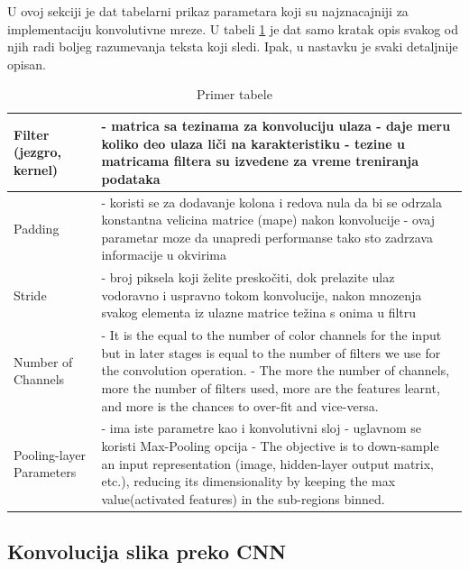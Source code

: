 \documentclass[a4paper]{article}
\begin{document}
U ovoj sekciji je dat tabelarni prikaz parametara koji su najznacajniji za implementaciju konvolutivne mreze. U tabeli \ref{tabela_parametri} je dat samo kratak opis svakog od njih radi boljeg razumevanja teksta koji sledi. Ipak, u nastavku je svaki detaljnije opisan.

\begin{table}[h!]
\begin{center}
\caption{Primer tabele}
\begin{tabular}{|l|p{60mm}|}
\hline
Filter (jezgro, kernel) &
- matrica sa tezinama za konvoluciju ulaza \newline
- daje meru koliko deo ulaza liči na karakteristiku \newline
- tezine u matricama filtera su izvedene za vreme treniranja podataka
\\
\hline
Padding &
- koristi se za dodavanje kolona i redova nula da bi se odrzala konstantna velicina matrice (mape) nakon konvolucije \newline
- ovaj parametar moze da unapredi performanse tako sto zadrzava informacije u okvirima
\\
\hline 
Stride &
- broj piksela koji želite preskočiti, dok prelazite ulaz vodoravno i uspravno tokom konvolucije, nakon mnozenja svakog elementa iz ulazne matrice težina s onima u filtru
\\
\hline 
Number of Channels &
- It is the equal to the number of color channels for the input but in later stages is equal to the number of filters we use for the convolution operation. \newline
- The more the number of channels, more the number of filters used, more are the features learnt, and more is the chances to over-fit and vice-versa.
\\
\hline 
Pooling-layer Parameters &
- ima iste parametre kao i konvolutivni sloj \newline
- uglavnom se koristi Max-Pooling opcija \newline
- The objective is to down-sample an input representation (image, hidden-layer output matrix, etc.), reducing its dimensionality by keeping the max value(activated features) in the sub-regions binned.
\\
\hline 
\end{tabular}
\label{tabela_parametri}
\end{center}
\end{table}


\subsection{Konvolucija slika preko CNN}
\end{document}
